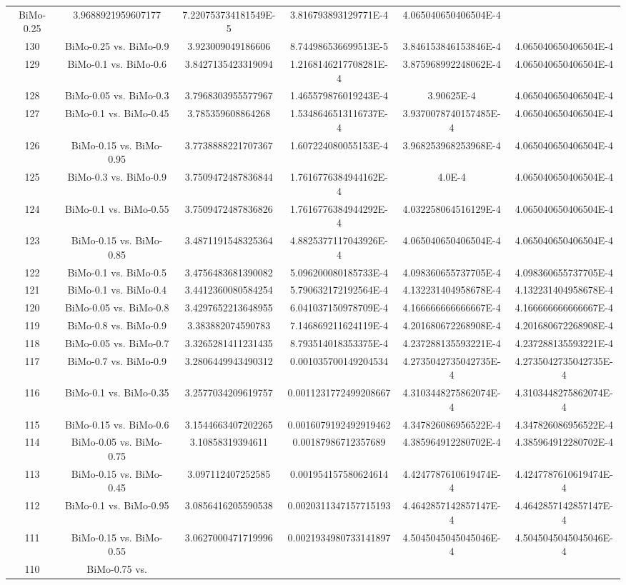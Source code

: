 \documentclass[a4paper,10pt]{article}
\begin{document}
\begin{landscape}
\begin{table}[!htp]
\begin{tabular}{cccccc}
BiMo-0.25&3.9688921959607177&7.220753734181549E-5&3.816793893129771E-4&4.065040650406504E-4\\130&BiMo-0.25 vs. BiMo-0.9&3.923009049186606&8.744986536699513E-5&3.846153846153846E-4&4.065040650406504E-4\\129&BiMo-0.1 vs. BiMo-0.6&3.8427135423319094&1.2168146217708281E-4&3.875968992248062E-4&4.065040650406504E-4\\128&BiMo-0.05 vs. BiMo-0.3&3.7968303955577967&1.465579876019243E-4&3.90625E-4&4.065040650406504E-4\\127&BiMo-0.1 vs. BiMo-0.45&3.785359608864268&1.5348646513116737E-4&3.9370078740157485E-4&4.065040650406504E-4\\126&BiMo-0.15 vs. BiMo-0.95&3.7738888221707367&1.607224080055153E-4&3.968253968253968E-4&4.065040650406504E-4\\125&BiMo-0.3 vs. BiMo-0.9&3.7509472487836844&1.7616776384944162E-4&4.0E-4&4.065040650406504E-4\\124&BiMo-0.1 vs. BiMo-0.55&3.7509472487836826&1.7616776384944292E-4&4.032258064516129E-4&4.065040650406504E-4\\123&BiMo-0.15 vs. BiMo-0.85&3.4871191548325364&4.8825377117043926E-4&4.065040650406504E-4&4.065040650406504E-4\\122&BiMo-0.1 vs. BiMo-0.5&3.4756483681390082&5.096200080185733E-4&4.098360655737705E-4&4.098360655737705E-4\\121&BiMo-0.1 vs. BiMo-0.4&3.4412360080584254&5.790632172192564E-4&4.132231404958678E-4&4.132231404958678E-4\\120&BiMo-0.05 vs. BiMo-0.8&3.4297652213648955&6.041037150978709E-4&4.166666666666667E-4&4.166666666666667E-4\\119&BiMo-0.8 vs. BiMo-0.9&3.383882074590783&7.146869211624119E-4&4.201680672268908E-4&4.201680672268908E-4\\118&BiMo-0.05 vs. BiMo-0.7&3.3265281411231435&8.793514018353375E-4&4.237288135593221E-4&4.237288135593221E-4\\117&BiMo-0.7 vs. BiMo-0.9&3.2806449943490312&0.001035700149204534&4.2735042735042735E-4&4.2735042735042735E-4\\116&BiMo-0.1 vs. BiMo-0.35&3.2577034209619757&0.0011231772499208667&4.3103448275862074E-4&4.3103448275862074E-4\\115&BiMo-0.15 vs. BiMo-0.6&3.1544663407202265&0.0016079192492919462&4.347826086956522E-4&4.347826086956522E-4\\114&BiMo-0.05 vs. BiMo-0.75&3.10858319394611&0.00187986712357689&4.385964912280702E-4&4.385964912280702E-4\\113&BiMo-0.15 vs. BiMo-0.45&3.097112407252585&0.001954157580624614&4.4247787610619474E-4&4.4247787610619474E-4\\112&BiMo-0.1 vs. BiMo-0.95&3.0856416205590538&0.0020311347157715193&4.4642857142857147E-4&4.4642857142857147E-4\\111&BiMo-0.15 vs. BiMo-0.55&3.0627000471719996&0.0021934980733141897&4.5045045045045046E-4&4.5045045045045046E-4\\110&BiMo-0.75 vs. 
\end{tabular}
\end{table}
\end{landscape}
\end{document}

